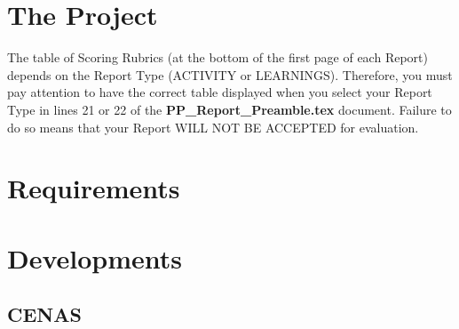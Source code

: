\documentclass[a4paper,12pt,journal,twoside,compsoc]{PPIEEEtran}
\begin{document}

\section{The Project}
The table of Scoring Rubrics (at the bottom of the first page of each Report) depends on the Report Type (ACTIVITY or LEARNINGS). Therefore, you must pay attention to have the correct table displayed when you select your Report Type in lines 21 or 22 of the \textbf{PP\_Report\_Preamble.tex} document. Failure to do so means that your Report WILL NOT BE ACCEPTED for evaluation.

\section{Requirements}



\section{Developments}
\subsection{CENAS}


\end{document}
